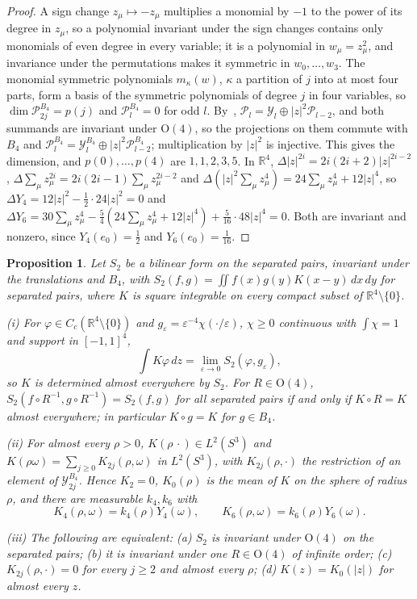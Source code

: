\documentclass[aps,prd,twocolumn,superscriptaddress,nofootinbib,longbibliography,floatfix,amsmath,amssymb,10pt]{revtex4-2}
\newtheorem{proposition}[theorem]{Proposition}
\theoremstyle{definition}
\theoremstyle{remark}
\newcommand{\R}{\mathbb{R}}
\begin{document}
\begin{proof}
A sign change $z_\mu\mapsto-z_\mu$ multiplies a monomial by $-1$ to the
power of its degree in $z_\mu$, so a polynomial invariant under the sign
changes contains only monomials of even degree in every variable; it is a
polynomial in $w_\mu=z_\mu^2$, and invariance under the permutations makes
it symmetric in $w_0,\dots,w_3$. The monomial symmetric polynomials
$m_\kappa(w)$, $\kappa$ a partition of $j$ into at most four parts, form a
basis of the symmetric polynomials of degree $j$ in four variables, so
$\dim\mathcal P_{2j}^{B_4}=p(j)$ and $\mathcal P_l^{B_4}=0$ for odd $l$.
By~\cite[Ch.~IV]{SW71}, $\mathcal P_l=\mathcal Y_l\oplus|z|^2\mathcal
P_{l-2}$, and both summands are invariant under $\mathrm O(4)$, so the
projections on them commute with $B_4$ and $\mathcal P_l^{B_4}=\mathcal
Y_l^{B_4}\oplus|z|^2\mathcal P_{l-2}^{B_4}$; multiplication by $|z|^2$ is
injective. This gives the dimension, and $p(0),\dots,p(4)$ are $1,1,2,3,5$.
In $\R^4$, $\Delta|z|^{2i}=2i(2i+2)|z|^{2i-2}$, $\Delta\sum_\mu z_\mu^{2i}=
2i(2i-1)\sum_\mu z_\mu^{2i-2}$ and $\Delta(|z|^2\sum_\mu z_\mu^4)=
24\sum_\mu z_\mu^4+12|z|^4$, so $\Delta Y_4=12|z|^2-\frac12\cdot24|z|^2=0$
and $\Delta Y_6=30\sum_\mu z_\mu^4-\frac54(24\sum_\mu z_\mu^4+12|z|^4)+
\frac5{16}\cdot48|z|^4=0$. Both are invariant and nonzero, since
$Y_4(e_0)=\frac12$ and $Y_6(e_0)=\frac1{16}$.
\end{proof}

\begin{proposition}\label{prop:limitEaniso}
Let $S_2$ be a bilinear form on the separated pairs, invariant under the
translations and $B_4$, with $S_2(f,g)=\iint f(x)g(y)K(x-y)\,dx\,dy$ for
separated pairs, where $K$ is square integrable on every compact subset of
$\R^4\setminus\{0\}$.

\textup{(i)} For $\varphi\in C_c(\R^4\setminus\{0\})$ and $g_\varepsilon=
\varepsilon^{-4}\chi(\cdot/\varepsilon)$, $\chi\ge0$ continuous with
$\int\chi=1$ and support in $[-1,1]^4$,
\[
\int K\varphi\,dz=\lim_{\varepsilon\to0}S_2(\varphi,g_\varepsilon),
\]
so $K$ is determined almost everywhere by $S_2$. For $R\in\mathrm O(4)$,
$S_2(f\circ R^{-1},g\circ R^{-1})=S_2(f,g)$ for all separated pairs if and
only if $K\circ R=K$ almost everywhere; in particular $K\circ g=K$ for
$g\in B_4$.

\textup{(ii)} For almost every $\rho>0$, $K(\rho\,\cdot)\in L^2(S^3)$ and
$K(\rho\omega)=\sum_{j\ge0}K_{2j}(\rho,\omega)$ in $L^2(S^3)$, with
$K_{2j}(\rho,\cdot)$ the restriction of an element of
$\mathcal Y_{2j}^{B_4}$. Hence $K_2=0$, $K_0(\rho)$ is the mean of $K$ on
the sphere of radius $\rho$, and there are measurable $k_4,k_6$ with
\[
K_4(\rho,\omega)=k_4(\rho)Y_4(\omega),\qquad K_6(\rho,\omega)=
k_6(\rho)Y_6(\omega).
\]

\textup{(iii)} The following are equivalent: \textup{(a)} $S_2$ is
invariant under $\mathrm O(4)$ on the separated pairs; \textup{(b)} it is
invariant under one $R\in\mathrm O(4)$ of infinite order; \textup{(c)}
$K_{2j}(\rho,\cdot)=0$ for every $j\ge2$ and almost every $\rho$;
\textup{(d)} $K(z)=K_0(|z|)$ for almost every $z$.
\end{proposition}
\end{document}

